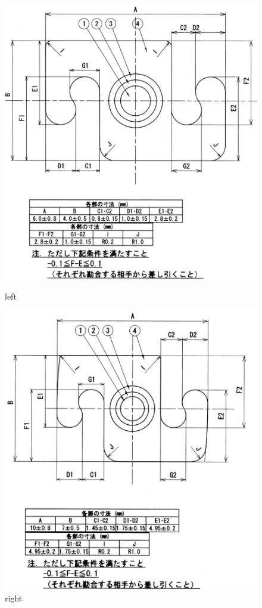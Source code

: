 \documentclass[
  report,
  a4paper,
  12pt,
  paperwidth=210mm,
  paperheight=297mm,
  hoffset=0mm,
  voffset=0mm,
  textwidth=175mm, %
  textheight=267mm %
]{jlreq}
\begin{document}
\begin{figure}
  \centering
    \begin{minipage}{0.4\columnwidth}
    \centering
    \includegraphics[width=\columnwidth]{SC_M-6-4.jpg}
    \caption{left}
    \label{fig:SC_M-6-4}
  \end{minipage}
  \begin{minipage}{0.4\columnwidth}
    \centering 
    \includegraphics[width=\columnwidth]{SC_M-10-7.jpg}
    \caption{right}
    \label{fig:SC_M-10-7}
  \end{minipage}
\end{figure} 
\end{document}
